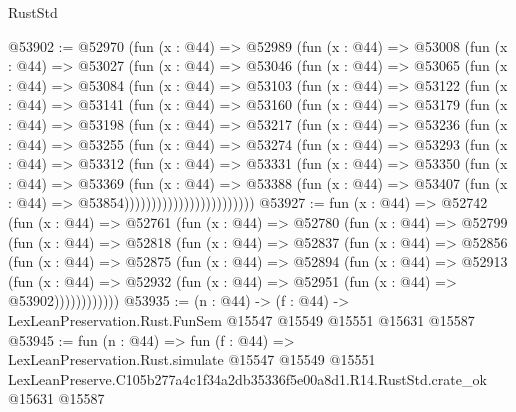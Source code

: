 \begin{lexlean}{RustStd}
\begin{coremodule}
@53902 := @52970
    (fun (x : @44) =>
    @52989
      (fun (x : @44) =>
      @53008
        (fun (x : @44) =>
        @53027
          (fun (x : @44) =>
          @53046
            (fun (x : @44) =>
            @53065
              (fun (x : @44) =>
              @53084
                (fun (x : @44) =>
                @53103
                  (fun (x : @44) =>
                  @53122
                    (fun (x : @44) =>
                    @53141
                      (fun (x : @44) =>
                      @53160
                        (fun (x : @44) =>
                        @53179
                          (fun (x : @44) =>
                          @53198
                            (fun (x : @44) =>
                            @53217
                              (fun (x : @44) =>
                              @53236
                                (fun (x : @44) =>
                                @53255
                                  (fun (x : @44) =>
                                  @53274
                                    (fun (x : @44) =>
                                    @53293
                                      (fun (x : @44) =>
                                      @53312
                                        (fun (x : @44) =>
                                        @53331
                                          (fun (x : @44) =>
                                          @53350
                                            (fun (x : @44) =>
                                            @53369
                                              (fun (x : @44) =>
                                              @53388
                                                (fun (x : @44) =>
                                                @53407
                                                  (fun (x : @44) => @53854))))))))))))))))))))))))
@53927 := fun (x : @44) =>
  @52742
    (fun (x : @44) =>
    @52761
      (fun (x : @44) =>
      @52780
        (fun (x : @44) =>
        @52799
          (fun (x : @44) =>
          @52818
            (fun (x : @44) =>
            @52837
              (fun (x : @44) =>
              @52856
                (fun (x : @44) =>
                @52875
                  (fun (x : @44) =>
                  @52894
                    (fun (x : @44) =>
                    @52913
                      (fun (x : @44) =>
                      @52932 (fun (x : @44) => @52951 (fun (x : @44) => @53902))))))))))))
@53935 := (n : @44) ->
  (f : @44) -> LexLeanPreservation.Rust.FunSem @15547 @15549 @15551 @15631 @15587
@53945 := fun (n : @44) =>
  fun (f : @44) =>
  LexLeanPreservation.Rust.simulate
    @15547
    @15549
    @15551
    LexLeanPreserve.C105b277a4c1f34a2db35336f5e00a8d1.R14.RustStd.crate_ok
    @15631
    @15587
\end{coremodule}
\end{lexlean}
